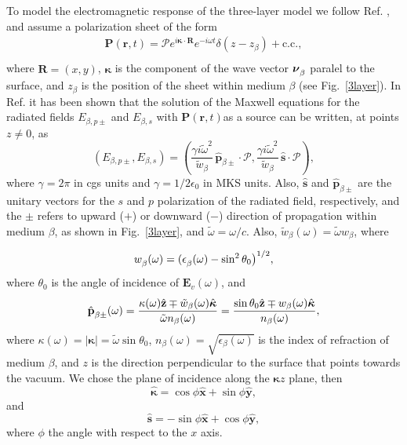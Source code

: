 To model the electromagnetic response of the three-layer model 
we follow Ref. \cite{mizrahiJOSA88},
and assume a polarization sheet of the form
\begin{align}\label{m31}
\mathbf{P}(\mathbf{r},t) = \boldsymbol{\mathcal{P}}
e^{i\boldsymbol{\kappa}\cdot\mathbf{R}}e^{-i\omega t}\delta(z - z_{\beta}) + \mathrm{c.c.}
,
\end{align}
where $\mathbf{R}=(x,y)$, $\boldsymbol{\kappa}$ 
is the component of the wave
vector $\boldsymbol{\nu}^{\strut}_{\beta}$ paralel to the surface, and
$z_{\beta}$ is the position of the sheet within
medium $\beta$ (see Fig.~\ref{3layer}).
In Ref. \cite{sipeJOSAB87} it has been shown 
that the solution of the Maxwell equations for the radiated fields 
$E_{\beta,p\pm}$ and $E_{\beta,s}$
with $\mathbf{P}(\mathbf{r},t)$as a source can be written, at points
$z\neq 0$, as 
\begin{equation}\label{r2}
(E_{\beta,p\pm},E_{\beta,s}) = 
(\frac{\gamma i\tilde\omega^2}{\tilde w_{\beta}}
\,\hat{\mathbf{p}}_{\beta\pm}\cdot\boldsymbol{\mathcal{P}},
\frac{\gamma i\tilde\omega^2}{\tilde w_{\beta}}
\,\hat{\mathbf{s}}\cdot\boldsymbol{\mathcal{P}}),
\end{equation} 
where $\gamma=2\pi$ in cgs units and $\gamma=1/2\epsilon_{0}$ in MKS units.
Also,
$\hat{\mathbf{s}}$ and $\hat{\mathbf{p}}_{\beta\pm}$ are the unitary vectors for
the $s$ and $p$ polarization of the radiated field, 
respectively, and the $\pm$ refers to upward ($+$) or
downward ($-$) direction of propagation within medium $\beta$, as shown in
Fig.~\ref{3layer}, and $\tilde\omega=\omega/c$.
Also, $\tilde w_{\beta}(\omega)=\tilde\omega w_{\beta}$, where
\begin{equation}\label{r3}
w^{\strut}_{\beta}(\omega)=(\epsilon^{\strut}_{\beta}(\omega) - \sin^2\theta_{0}\big)^{1/2},
\end{equation}
where $\theta_{0}$ is the angle of incidence of $\mathbf{E}_{v}(\omega)$, 
and
\begin{equation}\label{r4}
\hat{\mathbf{p}}^{\strut}_{\beta\pm}(\omega) =
\frac{\kappa(\omega)\hat{\mathbf{z}}\mp \tilde 
  w_{\beta}(\omega)\hat{\boldsymbol{\kappa}}} 
{\tilde\omega n_{\beta}(\omega)}
=
\frac{\sin\theta_{0}\hat{\mathbf{z}}\mp 
  w_{\beta}(\omega)\hat{\boldsymbol{\kappa}}} 
{n_{\beta}(\omega)}
,
\end{equation}
where $\kappa(\omega)=|\boldsymbol{\kappa}|=\tilde\omega\sin\theta_{0}$,
$n_{\beta}(\omega)=\sqrt{\epsilon_{\beta}(\omega)}$ is
the index of refraction of medium $\beta$, and
$z$ is the direction perpendicular to the surface that 
points towards the vacuum.
We chose the plane of incidence along the  
$\boldsymbol{\kappa}z$ plane, then 
\begin{equation}\label{mc1}
\hat{\boldsymbol{\kappa}}
= \cos\phi\hat{\mathbf{x}} + \sin\phi\hat{\mathbf{y}},
\end{equation}
and
\begin{equation}\label{mmc2}
\hat{\mathbf{s}} = -\sin\phi\hat{\mathbf{x}} + \cos\phi\hat{\mathbf{y}},
\end{equation}
where
$\phi$ the angle with respect to the $x$ axis.

